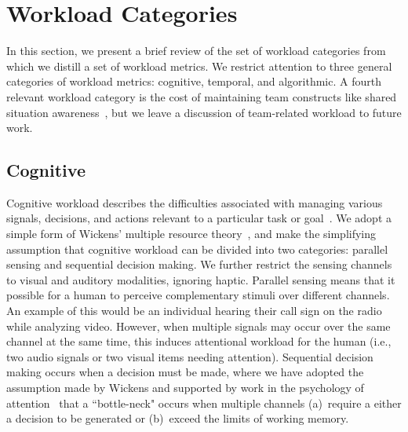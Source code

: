 \section{Workload Categories}

In this section, we present a brief review of the set of workload categories from which we distill a set of workload metrics.  We restrict attention to three general categories of workload metrics: cognitive, temporal, and algorithmic.  A fourth relevant workload category is the cost of maintaining team constructs like shared situation awareness~\cite{EliasFiore2011}, but we leave a discussion of team-related workload to future work.



\subsection{Cognitive}
Cognitive workload describes the difficulties associated with managing various signals, decisions, and actions relevant to a particular task or goal~\cite{MorayEtAl91,lebiere2013cognitive,Goodrich2004,Chadwick2004}. We adopt a simple form of Wickens' multiple resource theory~\cite{wickens2002multiple}, and make the simplifying assumption that cognitive workload can be divided into two categories: parallel sensing and sequential decision making. We further restrict the sensing channels to visual and auditory modalities, ignoring haptic.  Parallel sensing means that it possible for a human to perceive complementary stimuli over different channels. An example of this would be an individual hearing their call sign on the radio while analyzing video. However, when multiple signals may occur over the same channel at the same time, this induces attentional workload for the human (i.e., two audio signals or two visual items needing attention). Sequential decision making occurs when a decision must be made, where we have adopted the assumption made by Wickens and supported by work in the psychology of attention~\cite{Pashler98} that a ``bottle-neck" occurs when multiple channels (a)~require a either a decision to be generated or (b)~exceed the limits of working memory. 

